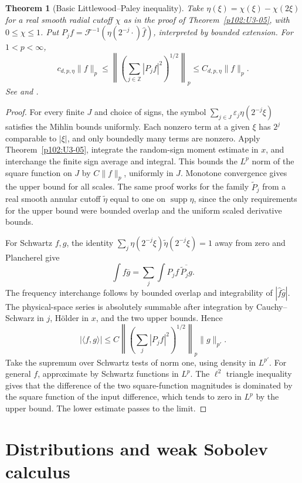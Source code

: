 \documentclass[11pt,oneside,openany]{book}
\newtheorem{theorem}{Theorem}[chapter]
\theoremstyle{definition}
\theoremstyle{remark}
\begin{document}
\begin{theorem}[Basic Littlewood--Paley inequality]
\label{p102:U3-06}
Take \(\eta(\xi)=\chi(\xi)-\chi(2\xi)\) for a real smooth radial cutoff \(\chi\) as in the proof of Theorem~\ref{p102:U3-05}, with \(0\le\chi\le1\). Put \(P_j f=\mathcal F^{-1}(\eta(2^{-j}\cdot)\widehat f)\), interpreted by bounded extension. For \(1<p<\infty\),
\[
 c_{d,p,\eta}\|f\|_p\le
 \left\|\left(\sum_{j\in\mathbb Z}|P_j f|^2\right)^{1/2}\right\|_p
 \le C_{d,p,\eta}\|f\|_p .
\]
See \cite[\S6.1.1]{grafakos} and \cite[\S10.8]{leoni}.
\end{theorem}
\begin{proof}
For every finite \(J\) and choice of signs, the symbol
\(\sum_{j\in J}\varepsilon_j\eta(2^{-j}\xi)\) satisfies the Mihlin bounds uniformly. Each nonzero term at a given \(\xi\) has \(2^j\) comparable to \(|\xi|\), and only boundedly many terms are nonzero. Apply Theorem~\ref{p102:U3-05}, integrate the random-sign moment estimate in \(x\), and interchange the finite sign average and integral. This bounds the \(L^p\) norm of the square function on \(J\) by \(C\|f\|_p\), uniformly in \(J\). Monotone convergence gives the upper bound for all scales. The same proof works for the family \(\widetilde P_j\) from a real smooth annular cutoff \(\widetilde\eta\) equal to one on \(\operatorname{supp}\eta\), since the only requirements for the upper bound were bounded overlap and the uniform scaled derivative bounds.

For Schwartz \(f,g\), the identity \(\sum_j\eta(2^{-j}\xi)\widetilde\eta(2^{-j}\xi)=1\) away from zero and Plancherel give
\[
 \int f\overline g=\sum_j\int P_j f\,\overline{\widetilde P_j g}.
\]
The frequency interchange follows by bounded overlap and integrability of \(|\widehat f\widehat g|\). The physical-space series is absolutely summable after integration by Cauchy--Schwarz in \(j\), Hölder in \(x\), and the two upper bounds. Hence
\[
 |\langle f,g\rangle|
 \le C\left\|\left(\sum_j|P_j f|^2\right)^{1/2}\right\|_p\|g\|_{p'}.
\]
Take the supremum over Schwartz tests of norm one, using density in \(L^{p'}\). For general \(f\), approximate by Schwartz functions in \(L^p\). The \(\ell^2\) triangle inequality gives that the difference of the two square-function magnitudes is dominated by the square function of the input difference, which tends to zero in \(L^p\) by the upper bound. The lower estimate passes to the limit.
\end{proof}
\chapter{Distributions and weak Sobolev calculus}
\label{ch:p102-u4}
\end{document}
